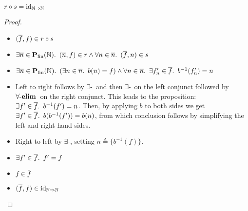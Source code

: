 \begin{prop}
  $r\circ s = \operatorname{id}_{\mathbb{N}\Rightarrow\mathbb{N}}$
  \begin{proof}~\\
  \begin{itemize}
  \item[\phantom{\imps}] $(\overline{f},f)\in r\circ s$

  \item[\iffs]
    $\exists\overline{n}\in\mathbf{P}_{\operatorname{fin}}(\mathbb{N})\ldotp~(\overline{n},f)\in r\land\forall n\in\overline{n}\ldotp~(\overline{f},n)\in s$

  \item[\iffs]
    $\exists\overline{n}\in\mathbf{P}_{\operatorname{fin}}(\mathbb{N})\ldotp~(\exists n\in\overline{n}\ldotp~b(n) = f)\land\forall n\in\overline{n}\ldotp~\exists f^\prime_n\in\overline{f}\ldotp~b^{-1}(f^\prime_n) = n$

  \item[\phantom{\imps}]
    Left to right follows by $\exists$-\Elim~and then $\exists$-\Elim~on the left conjunct followed by ${\forall\text{-\textbf{elim}}}$~on the right conjunct. This leads to the proposition: ${\exists f^\prime\in\overline{f}\ldotp~b^{-1}(f^\prime) = n}$. Then, by applying $b$ to both sides we get ${\exists f^\prime\in\overline{f}\ldotp~b(b^{-1}(f^\prime)) = b(n)}$, from which conclusion follows by simplifying the left and right hand sides.

  \item[\phantom{\imps}]
    Right to left by $\exists$-\Intro, setting $\overline{n}\triangleq\{b^{-1}(f)\}$.

  \item[\iffs]
    $\exists f^\prime\in\overline{f}\ldotp~f^\prime = f$

  \item[\iffs]
    $f\in\overline{f}$

  \item[\iffs]
    $(\overline{f}, f)\in\operatorname{id}_{\mathbb{N}\Rightarrow\mathbb{N}}$
    \marginnote{\Def-$\id$}
    \qedhere
  \end{itemize}
  \end{proof}
\end{prop}

